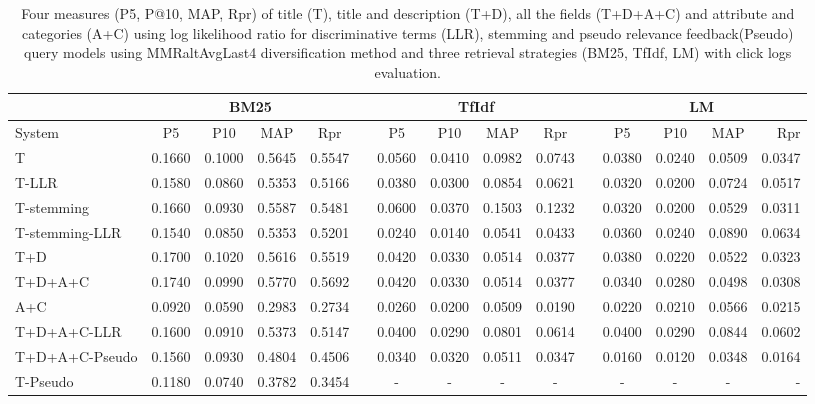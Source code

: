 \begin{table}[H]
\begin{center}
\scriptsize
\caption{
Four measures (P\@5, P@10, MAP, Rpr) of title (T), title and description (T+D), all the fields (T+D+A+C) and attribute and categories (A+C) using log likelihood ratio for discriminative terms (LLR), stemming and pseudo relevance feedback(Pseudo) query models using MMRaltAvgLast4 diversification method and three retrieval strategies (BM25, TfIdf, LM) with click logs evaluation.}
\label{table:mmrAltAvgLast4Cl}

\begin{tabular}{lcccccccccccccr}
\toprule
 & \multicolumn{4}{c}{BM25} &    & \multicolumn{4}{c}{TfIdf} &    & \multicolumn{4}{c}{LM} \\
\midrule
System & P\@5 & P\@10 & MAP & Rpr &   & P\@5 & P\@10 & MAP & Rpr &   & P\@5 & P\@10 & MAP & Rpr \\
\midrule
T & 0.1660 & 0.1000 & 0.5645 & 0.5547 &   & 0.0560 & 0.0410 & 0.0982 & 0.0743 &   & 0.0380 & 0.0240 & 0.0509 & 0.0347 \\
T-LLR & 0.1580 & 0.0860 & 0.5353 & 0.5166 &   & 0.0380 & 0.0300 & 0.0854 & 0.0621 &   & 0.0320 & 0.0200 & 0.0724 & 0.0517 \\
T-stemming & 0.1660 & 0.0930 & 0.5587 & 0.5481 &   & 0.0600 & 0.0370 & 0.1503 & 0.1232 &   & 0.0320 & 0.0200 & 0.0529 & 0.0311 \\
T-stemming-LLR & 0.1540 & 0.0850 & 0.5353 & 0.5201 &   & 0.0240 & 0.0140 & 0.0541 & 0.0433 &   & 0.0360 & 0.0240 & 0.0890 & 0.0634 \\
T+D & 0.1700 & 0.1020 & 0.5616 & 0.5519 &   & 0.0420 & 0.0330 & 0.0514 & 0.0377 &   & 0.0380 & 0.0220 & 0.0522 & 0.0323 \\
T+D+A+C & 0.1740 & 0.0990 & 0.5770 & 0.5692 &   & 0.0420 & 0.0330 & 0.0514 & 0.0377 &   & 0.0340 & 0.0280 & 0.0498 & 0.0308 \\
A+C & 0.0920 & 0.0590 & 0.2983 & 0.2734 &   & 0.0260 & 0.0200 & 0.0509 & 0.0190 &   & 0.0220 & 0.0210 & 0.0566 & 0.0215 \\
T+D+A+C-LLR & 0.1600 & 0.0910 & 0.5373 & 0.5147 &   & 0.0400 & 0.0290 & 0.0801 & 0.0614 &   & 0.0400 & 0.0290 & 0.0844 & 0.0602 \\
T+D+A+C-Pseudo & 0.1560 & 0.0930 & 0.4804 & 0.4506 &   & 0.0340 & 0.0320 & 0.0511 & 0.0347 &   & 0.0160 & 0.0120 & 0.0348 & 0.0164 \\
T-Pseudo & 0.1180 & 0.0740 & 0.3782 & 0.3454 &   & - & - & - & - &   & - & - & - & -  \\
\bottomrule
\end{tabular}
\end{center}
\end{table}

